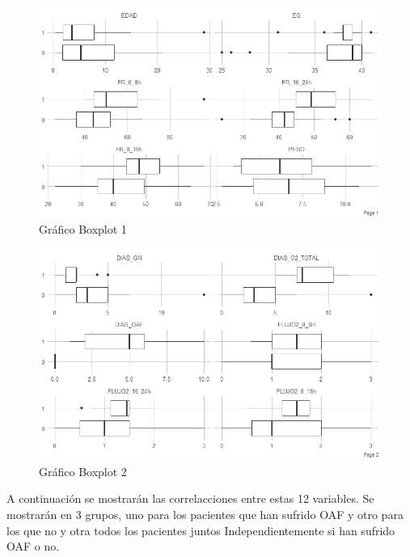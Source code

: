 \begin{figure}[H]
    \centering
    \includegraphics[scale = 0.85]{./img/boxplt1.png}
    \caption{Gráfico Boxplot 1}\label{fig:boxplt1}
\end{figure}

\begin{figure}[H]
    \centering
    \includegraphics[scale = 0.85]{./img/boxplt2.png}
    \caption{Gráfico Boxplot 2}\label{fig:boxplt2}
\end{figure}

A continuación se mostrarán las correlacciones entre estas 12 variables. Se mostrarán en $3$ grupos, uno para los pacientes que han sufrido OAF y otro para los que no y otra todos los pacientes juntos Independientemente si han sufrido OAF o no. 

